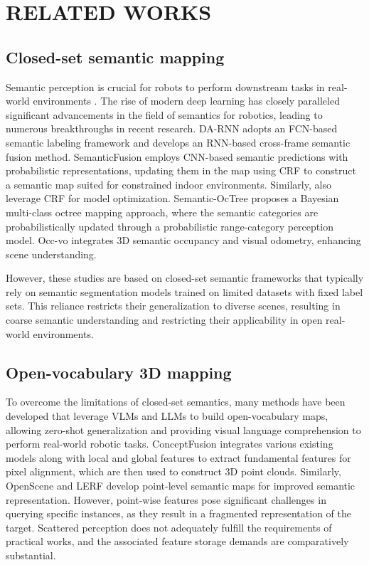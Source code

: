 \section{RELATED WORKS}
\label{RW}

\subsection{Closed-set semantic mapping}
Semantic perception is crucial for robots to perform downstream tasks in real-world environments \cite{garg2020semantics, deng2022s}. The rise of modern deep learning has closely paralleled significant advancements in the field of semantics for robotics, leading to numerous breakthroughs in recent research. 
DA-RNN \cite{DA-RNN} adopts an FCN-based semantic labeling framework and develops an RNN-based cross-frame semantic fusion method. 
SemanticFusion \cite{semanticfusion} employs CNN-based semantic predictions with probabilistic representations, updating them in the map using CRF to construct a semantic map suited for constrained indoor environments. Similarly, \cite{semi-dense, semantic3d, Incremental-dense} also leverage CRF for model optimization.
Semantic-OcTree \cite{Semantic-OcTree} proposes a Bayesian multi-class octree mapping approach, where the semantic categories are probabilistically updated through a probabilistic range-category perception model. Occ-vo \cite{Occ-vo} integrates 3D semantic occupancy and visual odometry, enhancing scene understanding.

However, these studies are based on closed-set semantic frameworks that typically rely on semantic segmentation models trained on limited datasets with fixed label sets. This reliance restricts their generalization to diverse scenes, resulting in coarse semantic understanding and restricting their applicability in open real-world environments.


\subsection{Open-vocabulary 3D mapping}

To overcome the limitations of closed-set semantics, many methods have been developed that leverage VLMs and LLMs to build open-vocabulary maps, allowing zero-shot generalization and providing visual language comprehension to perform real-world robotic tasks.
ConceptFusion \cite{conceptfusion} integrates various existing models along with local and global features to extract fundamental features for pixel alignment, which are then used to construct 3D point clouds.
Similarly, OpenScene \cite{peng2023openscene} and LERF \cite{lerf} develop point-level semantic maps for improved semantic representation. 
However, point-wise features pose significant challenges in querying specific instances, as they result in a fragmented representation of the target. Scattered perception does not adequately fulfill the requirements of practical works, and the associated feature storage demands are comparatively substantial.

